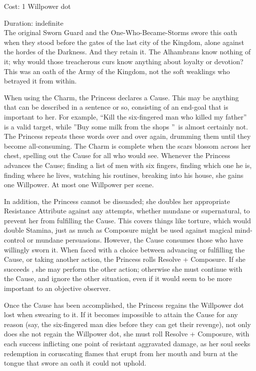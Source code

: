 \noindent Cost: 1 Willpower dot

\noindent Duration: indefinite \\

\noindent The original Sworn Guard and the One-Who-Became-Storms swore this oath when they stood before the gates of the last city of the Kingdom, alone against the hordes of the Darkness. And they retain it. The Alhambrans know nothing of it; why would those treacherous curs know anything about loyalty or devotion? This was an oath of the Army of the Kingdom, not the soft weaklings who betrayed it from within. 

When using the Charm, the Princess declares a Cause. This may be anything that can be described in a sentence or so, consisting of an end-goal that is important to her. For example, \textquotedblleft Kill the six-fingered man who killed my father\textquotedblright\, is a valid target, while \textquotedblright Buy some milk from the shops \textquotedblright\, is almost certainly not. The Princess repeats these words over and over again, drumming them until they become all-consuming. The Charm is complete when the scars blossom across her chest, spelling out the Cause for all who would see. Whenever the Princess advances the Cause; finding a list of men with six fingers, finding which one he is, finding where he lives, watching his routines, breaking into his house, she gains one Willpower. At most one Willpower per scene. 

In addition, the Princess cannot be dissuaded; she doubles her appropriate Resistance Attribute against any attempts, whether mundane or supernatural, to prevent her from fulfilling the Cause. This covers things like torture, which would double Stamina, just as much as Composure might be used against magical mind-control or mundane persuasions. However, the Cause consumes those who have willingly sworn it. When faced with a choice between advancing or fulfilling the Cause, or taking another action, the Princess rolls Resolve + Composure. If she succeeds , she may perform the other action; otherwise she must continue with the Cause, and ignore the other situation, even if it would seem to be more important to an objective observer. 

Once the Cause has been accomplished, the Princess regains the Willpower dot lost when swearing to it. If it becomes impossible to attain the Cause for any reason (say, the six-fingered man dies before they can get their revenge), not only does she not regain the Willpower dot, she must roll Resolve + Composure, with each success inflicting one point of resistant aggravated damage, as her soul seeks redemption in coruscating flames that erupt from her mouth and burn at the tongue that swore an oath it could not uphold. 

